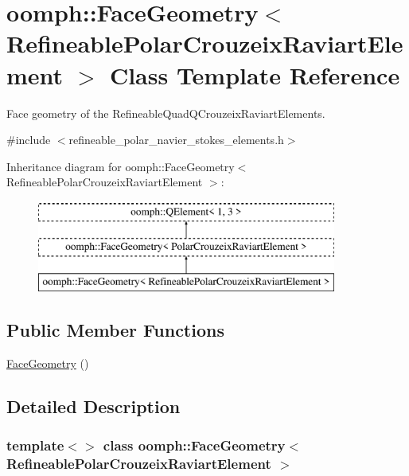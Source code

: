 \hypertarget{classoomph_1_1FaceGeometry_3_01RefineablePolarCrouzeixRaviartElement_01_4}{}\section{oomph\+:\+:Face\+Geometry$<$ Refineable\+Polar\+Crouzeix\+Raviart\+Element $>$ Class Template Reference}
\label{classoomph_1_1FaceGeometry_3_01RefineablePolarCrouzeixRaviartElement_01_4}


Face geometry of the Refineable\+Quad\+Q\+Crouzeix\+Raviart\+Elements.  




{\ttfamily \#include $<$refineable\+\_\+polar\+\_\+navier\+\_\+stokes\+\_\+elements.\+h$>$}

Inheritance diagram for oomph\+:\+:Face\+Geometry$<$ Refineable\+Polar\+Crouzeix\+Raviart\+Element $>$\+:\begin{figure}[H]
\begin{center}
\leavevmode
\includegraphics[height=3.000000cm]{classoomph_1_1FaceGeometry_3_01RefineablePolarCrouzeixRaviartElement_01_4}
\end{center}
\end{figure}
\subsection*{Public Member Functions}
\begin{DoxyCompactItemize}
\item 
\hyperlink{classoomph_1_1FaceGeometry_3_01RefineablePolarCrouzeixRaviartElement_01_4_ab38e8be9a6f7fd7c16f27a410f7bc9cf}{Face\+Geometry} ()
\end{DoxyCompactItemize}


\subsection{Detailed Description}
\subsubsection*{template$<$$>$\newline
class oomph\+::\+Face\+Geometry$<$ Refineable\+Polar\+Crouzeix\+Raviart\+Element $>$}

